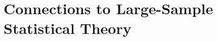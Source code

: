 \documentclass[10pt]{article}
\def\themonth{\ifcase\month\or
  January\or February\or March\or April\or May\or June\or
  July\or August\or September\or October\or November\or December\fi}
\begin{document}

\part{Connections to Large-Sample Statistical Theory}
\end{document}
